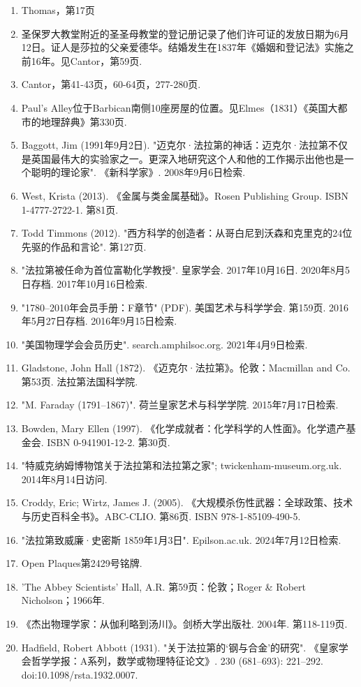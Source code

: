 \begin{enumerate}
\item Thomas，第17页
\item 圣保罗大教堂附近的圣圣母教堂的登记册记录了他们许可证的发放日期为6月12日。证人是莎拉的父亲爱德华。结婚发生在1837年《婚姻和登记法》实施之前16年。见Cantor，第59页.
\item Cantor，第41-43页，60-64页，277-280页.
\item Paul’s Alley位于Barbican南侧10座房屋的位置。见Elmes（1831）《英国大都市的地理辞典》第330页.
\item Baggott, Jim (1991年9月2日). "迈克尔·法拉第的神话：迈克尔·法拉第不仅是英国最伟大的实验家之一。更深入地研究这个人和他的工作揭示出他也是一个聪明的理论家". 《新科学家》. 2008年9月6日检索.
\item West, Krista (2013). 《金属与类金属基础》。Rosen Publishing Group. ISBN 1-4777-2722-1. 第81页.
\item Todd Timmons (2012). "西方科学的创造者：从哥白尼到沃森和克里克的24位先驱的作品和言论". 第127页.
\item "法拉第被任命为首位富勒化学教授". 皇家学会. 2017年10月16日. 2020年8月5日存档. 2017年10月16日检索.
\item "1780–2010年会员手册：F章节" (PDF). 美国艺术与科学学会. 第159页. 2016年5月27日存档. 2016年9月15日检索.
\item "美国物理学会会员历史". search.amphilsoc.org. 2021年4月9日检索.
\item Gladstone, John Hall (1872). 《迈克尔·法拉第》。伦敦：Macmillan and Co. 第53页. 法拉第法国科学院.
\item "M. Faraday (1791–1867)". 荷兰皇家艺术与科学学院. 2015年7月17日检索.
\item Bowden, Mary Ellen (1997). 《化学成就者：化学科学的人性面》。化学遗产基金会. ISBN 0-941901-12-2. 第30页.
\item "特威克纳姆博物馆关于法拉第和法拉第之家"; twickenham-museum.org.uk. 2014年8月14日访问.
\item Croddy, Eric; Wirtz, James J. (2005). 《大规模杀伤性武器：全球政策、技术与历史百科全书》。ABC-CLIO. 第86页. ISBN 978-1-85109-490-5.
\item "法拉第致威廉·史密斯 1859年1月3日". Epilson.ac.uk. 2024年7月12日检索.
\item Open Plaques第2429号铭牌.
\item 'The Abbey Scientists' Hall, A.R. 第59页：伦敦；Roger & Robert Nicholson；1966年.
\item 《杰出物理学家：从伽利略到汤川》。剑桥大学出版社. 2004年. 第118-119页.
\item Hadfield, Robert Abbott (1931). "关于法拉第的‘钢与合金’的研究". 《皇家学会哲学学报：A系列，数学或物理特征论文》. 230 (681–693): 221–292. doi:10.1098/rsta.1932.0007.

\end{enumerate}
